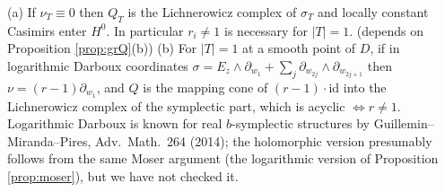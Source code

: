 \begin{prop}\label{prop:genNec}
(a) If $\nu_T\equiv0$ then $Q_T$ is the Lichnerowicz complex of $\sigma_T$ and locally constant Casimirs enter $H^0$. In particular $r_i\ne1$ is necessary for $|T|=1$. \tP \tQ (depends on Proposition \ref{prop:grQ}(b))
(b) For $|T|=1$ at a smooth point of $D$, if in logarithmic Darboux coordinates $\sigma=E_z\wedge\partial_{w_1}+\sum_j\partial_{w_{2j}}\wedge\partial_{w_{2j+1}}$ then $\nu=(r-1)\partial_{w_1}$, and $Q$ is the mapping cone of $(r-1)\cdot\mathrm{id}$ into the Lichnerowicz complex of the symplectic part, which is acyclic $\iff r\ne1$. \tC \tQ Logarithmic Darboux is known for real $b$-symplectic structures by Guillemin--Miranda--Pires, Adv.\ Math.\ 264 (2014); the holomorphic version presumably follows from the same Moser argument (the logarithmic version of Proposition \ref{prop:moser}), but we have not checked it.
\end{prop}

